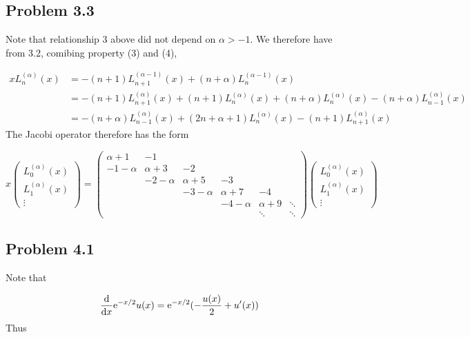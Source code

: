 \documentclass[12pt,a4paper]{article}
\def\D{ {\rm d} }
\def\E{ {\rm e} }
\def\dx{\D x}
\begin{document}
\subsection{Problem 3.3}
Note that relationship 3 above did not depend on $\alpha >-1$.  We therefore have from 3.2, comibing property (3) and (4),


\begin{align*}
x L_n^{(\alpha)}(x) &= -(n+1)L_{n+1}^{(\alpha-1)}(x) +(n+\alpha)L_n^{(\alpha-1)}(x) \\
  &= -(n+1)L_{n+1}^{(\alpha)}(x) + (n+1)L_{n}^{(\alpha)}(x) +(n+\alpha)L_{n}^{(\alpha)}(x) - (n+\alpha)L_{n-1}^{(\alpha)}(x) \\
  &= - (n+\alpha)L_{n-1}^{(\alpha)}(x) + (2n+\alpha+1) L_n^{(\alpha)}(x) -(n+1)L_{n+1}^{(\alpha)}(x)
\end{align*}
The Jacobi operator therefore has the form

\[
x \begin{pmatrix} L_0^{(\alpha)}(x) \\
            L_1^{(\alpha)}(x) \\
                \vdots
                \end{pmatrix} = \begin{pmatrix} \alpha+1 &-1 \\
                                                -1-\alpha & \alpha+3 & -2 \\
                                                   & -2-\alpha & \alpha+5 &-3 \\                  &       & -3-\alpha & \alpha+7 &-4 \\
                                                      &&   & -4-\alpha & \alpha+9 &\ddots \\
                                                      &&&&\ddots & \ddots
                                                    \end{pmatrix} \begin{pmatrix} L_0^{(\alpha)}(x) \\
            L_1^{(\alpha)}(x) \\
                \vdots
                \end{pmatrix}
\]
\subsection{Problem 4.1}
Note that

\[
{\D \over \dx} \E^{-x/2} u(x) =  \E^{-x/2} (-{u(x) \over 2} +u'(x)) 
\]
Thus 
\end{document}
